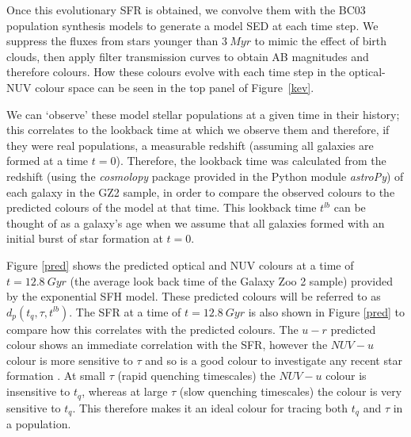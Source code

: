 \documentclass{mn2e}
\begin{document}
Once this evolutionary SFR is obtained, we convolve them with the BC03 population synthesis models to generate a model SED at each time step. We suppress the fluxes from stars younger than $3~Myr$ to mimic the effect of birth clouds, then apply filter transmission curves to obtain AB magnitudes and therefore colours. How these colours evolve with each time step in the optical-NUV colour space can be seen in the top panel of Figure~\ref{kev}.


We can `observe' these model stellar populations at a given time in their history; this correlates to the lookback time at which we observe them and therefore, if they were real populations, a measurable redshift (assuming all galaxies are formed at a time $t=0$). Therefore, the lookback time was calculated from the redshift (using the \emph{cosmolopy} package provided in the Python module \emph{astroPy}) of each galaxy in the GZ2 sample, in order to compare the observed colours to the predicted colours of the model at that time. This lookback time $t^{lb}$ can be thought of as a galaxy's age when we assume that all galaxies formed with an initial burst of star formation at $t=0$. 

Figure \ref{pred} shows the predicted optical and NUV colours at a time of $t = 12.8 ~Gyr$ (the average look back time of the Galaxy Zoo 2 sample) provided by the exponential SFH model. These predicted colours will be referred to as $d_{p}(t_{q}, \tau, t^{lb})$. The SFR at a time of $t=12.8~Gyr$ is also shown in Figure \ref{pred} to compare how this correlates with the predicted colours. The $u-r$ predicted colour shows an immediate correlation with the SFR, however the $NUV-u$ colour is more sensitive to $\tau$ and so is a good colour to investigate any recent star formation . At small $\tau$ (rapid quenching timescales) the $NUV-u$ colour is insensitive to $t_{q}$, whereas at large $\tau$ (slow quenching timescales) the colour is very sensitive to $t_{q}$. This therefore makes it an ideal colour for tracing both $t_{q}$ and $\tau$ in a population. 
\end{document}
